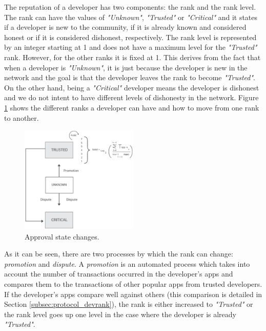 The reputation of a developer has two components: the rank and the rank level. The rank can have the values of \textit{"Unknown"}, \textit{"Trusted"} or \textit{"Critical"} and it states if a developer is new to the community, if it is already known and considered honest or if it is considered dishonest, respectively. The rank level is represented by an integer starting at 1 and does not have a maximum level for the \textit{"Trusted"} rank. However, for the other ranks it is fixed at 1. This derives from the fact that when a developer is \textit{"Unknown"}, it is just because the developer is new in the network and the goal is that the developer leaves the rank to become \textit{"Trusted"}. On the other hand, being a \textit{"Critical"} developer means the developer is dishonest and we do not intent to have different levels of dishonesty in the network. Figure \ref{fig:approval_state_diagram} shows the different ranks a developer can have and how to move from one rank to another. \\

\begin{figure}[!ht]
\centering
\includegraphics[width=0.5\textwidth]{diagrams/approval_state_diagram.eps}
\caption{Approval state changes.}
\label{fig:approval_state_diagram}
\end{figure}

As it can be seen, there are two processes by which the rank can change: \textit{promotion} and \textit{dispute}. A \textit{promotion} is an automated process which takes into account the number of transactions occurred in the developer's apps and compares them to the transactions of other popular apps from trusted developers. If the developer's apps compare well against others (this comparison is detailed in Section \ref{subsec:protocol_devrank}), the rank is either increased to \textit{"Trusted"} or the rank level goes up one level in the case where the developer is already \textit{"Trusted"}. \\


